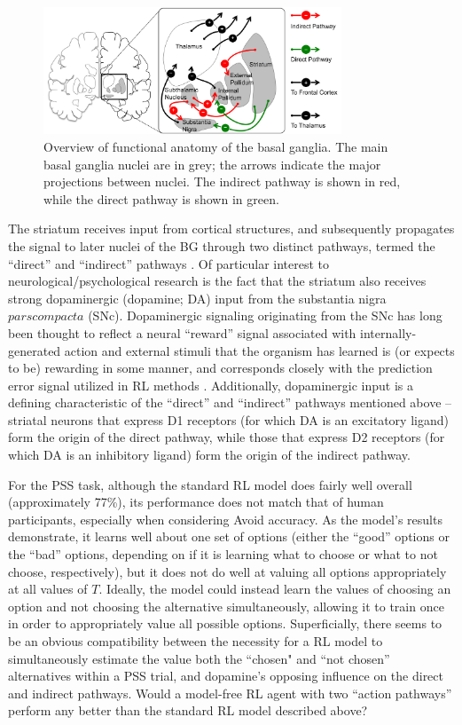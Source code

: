 \documentclass[10pt,letterpaper]{article}
\begin{document}
\begin{figure}[ht]
	\begin{center}
		\includegraphics[width=3.5in]{basal-ganglia.png}
	\end{center}
	\caption{Overview of functional anatomy of the basal ganglia. The main basal ganglia nuclei are in grey; the arrows indicate the major projections between nuclei. The indirect pathway is shown in red, while the direct pathway is shown in green.} 
	\label{bg}
\end{figure}

The striatum receives input from cortical structures, and subsequently propagates the signal to later nuclei of the BG through two distinct pathways, termed the ``direct'' and ``indirect'' pathways \cite{smith1998microcircuitry}. Of particular interest to neurological/psychological research is the fact that the striatum also receives strong dopaminergic (dopamine; DA) input from the substantia nigra $pars compacta$ (SNc). Dopaminergic signaling originating from the SNc has long been thought to reflect a neural ``reward'' signal associated with internally-generated action and external stimuli that the organism has learned is (or expects to be) rewarding in some manner, and corresponds closely with the prediction error signal utilized in RL methods \cite{schultz2000multuple, schultz1997neural}. Additionally, dopaminergic input is a defining characteristic of the ``direct'' and ``indirect'' pathways mentioned above -- striatal neurons that express D1 receptors (for which DA is an excitatory ligand) form the origin of the direct pathway, while those that express D2 receptors (for which DA is an inhibitory ligand) form the origin of the indirect pathway.

For the PSS task, although the standard RL model does fairly well overall (approximately 77\%), its performance does not match that of human participants, especially when considering Avoid accuracy. As the model's results demonstrate, it learns well about one set of options (either the ``good'' options or the ``bad'' options, depending on if it is learning what to choose or what to not choose, respectively), but it does not do well at valuing all options appropriately at all values of $T$. Ideally, the model could instead learn the values of choosing an option and not choosing the alternative simultaneously, allowing it to train once in order to appropriately value all possible options. Superficially, there seems to be an obvious compatibility between the necessity for a RL model to simultaneously estimate the value both the ``chosen" and ``not chosen'' alternatives within a PSS trial, and dopamine's opposing influence on the direct and indirect pathways. Would a model-free RL agent with two ``action pathways'' perform any better than the standard RL model described above?
\end{document}
